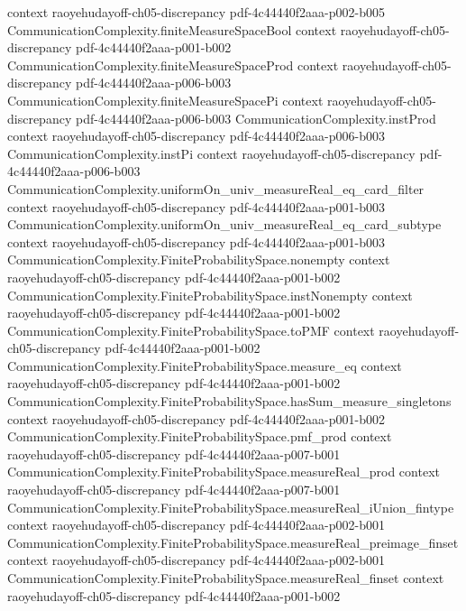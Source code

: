 \begin{lemma}
  {context}
  {raoyehudayoff-ch05-discrepancy}
  {pdf-4c44440f2aaa-p002-b005}
\proofstep
  {CommunicationComplexity.finiteMeasureSpaceBool}
  {context}
  {raoyehudayoff-ch05-discrepancy}
  {pdf-4c44440f2aaa-p001-b002}
\proofstep
  {CommunicationComplexity.finiteMeasureSpaceProd}
  {context}
  {raoyehudayoff-ch05-discrepancy}
  {pdf-4c44440f2aaa-p006-b003}
\proofstep
  {CommunicationComplexity.finiteMeasureSpacePi}
  {context}
  {raoyehudayoff-ch05-discrepancy}
  {pdf-4c44440f2aaa-p006-b003}
\proofstep
  {CommunicationComplexity.instProd}
  {context}
  {raoyehudayoff-ch05-discrepancy}
  {pdf-4c44440f2aaa-p006-b003}
\proofstep
  {CommunicationComplexity.instPi}
  {context}
  {raoyehudayoff-ch05-discrepancy}
  {pdf-4c44440f2aaa-p006-b003}
\proofstep
  {CommunicationComplexity.uniformOn_univ_measureReal_eq_card_filter}
  {context}
  {raoyehudayoff-ch05-discrepancy}
  {pdf-4c44440f2aaa-p001-b003}
\proofstep
  {CommunicationComplexity.uniformOn_univ_measureReal_eq_card_subtype}
  {context}
  {raoyehudayoff-ch05-discrepancy}
  {pdf-4c44440f2aaa-p001-b003}
\proofstep
  {CommunicationComplexity.FiniteProbabilitySpace.nonempty}
  {context}
  {raoyehudayoff-ch05-discrepancy}
  {pdf-4c44440f2aaa-p001-b002}
\proofstep
  {CommunicationComplexity.FiniteProbabilitySpace.instNonempty}
  {context}
  {raoyehudayoff-ch05-discrepancy}
  {pdf-4c44440f2aaa-p001-b002}
\proofstep
  {CommunicationComplexity.FiniteProbabilitySpace.toPMF}
  {context}
  {raoyehudayoff-ch05-discrepancy}
  {pdf-4c44440f2aaa-p001-b002}
\proofstep
  {CommunicationComplexity.FiniteProbabilitySpace.measure_eq}
  {context}
  {raoyehudayoff-ch05-discrepancy}
  {pdf-4c44440f2aaa-p001-b002}
\proofstep
  {CommunicationComplexity.FiniteProbabilitySpace.hasSum_measure_singletons}
  {context}
  {raoyehudayoff-ch05-discrepancy}
  {pdf-4c44440f2aaa-p001-b002}
\proofstep
  {CommunicationComplexity.FiniteProbabilitySpace.pmf_prod}
  {context}
  {raoyehudayoff-ch05-discrepancy}
  {pdf-4c44440f2aaa-p007-b001}
\proofstep
  {CommunicationComplexity.FiniteProbabilitySpace.measureReal_prod}
  {context}
  {raoyehudayoff-ch05-discrepancy}
  {pdf-4c44440f2aaa-p007-b001}
\proofstep
  {CommunicationComplexity.FiniteProbabilitySpace.measureReal_iUnion_fintype}
  {context}
  {raoyehudayoff-ch05-discrepancy}
  {pdf-4c44440f2aaa-p002-b001}
\proofstep
  {CommunicationComplexity.FiniteProbabilitySpace.measureReal_preimage_finset}
  {context}
  {raoyehudayoff-ch05-discrepancy}
  {pdf-4c44440f2aaa-p002-b001}
\proofstep
  {CommunicationComplexity.FiniteProbabilitySpace.measureReal_finset}
  {context}
  {raoyehudayoff-ch05-discrepancy}
  {pdf-4c44440f2aaa-p001-b002}

\end{lemma}
